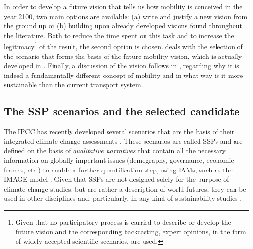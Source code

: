In order to develop a future vision that tells us how mobility is conceived in the year 2100, two main options are available: (a) write and justify a new vision from the ground up or (b) building upon already developed visions found throughout the literature. Both to reduce the time spent on this task and to increase the legitimacy\footnote{Given that no participatory process is carried to describe or develop the future vision and the corresponding backcasting, expert opinions, in the form of widely accepted scientific scenarios, are used.} of the result, the second option is chosen.  deals with the selection of the scenario that forms the basis of the future mobility vision, which is actually developed in . Finally, a discussion of the vision follows in , regarding why it is indeed a fundamentally different concept of mobility and in what way is it more sustainable than the current transport system.

\subsection{The SSP scenarios and the selected candidate}
\label{ss:results:ssp-scenarios-candidate}
The \gls{IPCC} has recently developed several scenarios that are the basis of their integrated climate change assessments \parencite{oneill2017_roadsaheadNarratives,vuuren2017_Energylanduse,fricko2017_markerquantificationShared,fujimori2017_SSP3AIMimplementation,calvin2017_SSP4worlddeepening,kriegler2017_Fossilfueleddevelopment}. These scenarios are called \glspl{SSP} and are defined on the basis of \emph{qualitative narratives} that contain all the necessary information on globally important issues (demography, governance, economic frames, etc.) to enable a further quantification step, using \glspl{IAM}, such as the IMAGE model \parencite{vuuren2017_Energylanduse}. Given that SSPs are not designed solely for the purpose of climate change studies, but are rather a description of world futures, they can be used in other disciplines and, particularly, in any kind of sustainability studies \parencite{oneill2017_roadsaheadNarratives}. 

